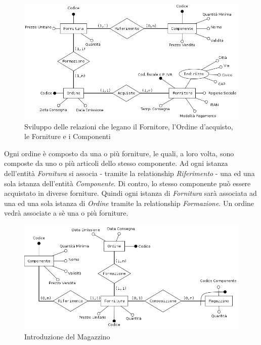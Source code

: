 			\begin{figure}[H]
				\centering
				\includegraphics[width=13cm]{images/finitures/fornitore_ordine_fornitura_componente}
				\caption{Sviluppo delle relazioni che legano il Fornitore, l'Ordine d'acquisto, le Forniture e i Componenti}
				\label{fig:fornitore_ordine_fornitura_componente}
			\end{figure}
			
			Ogni ordine è composto da una o più forniture, le quali, a loro volta, sono composte da uno o più articoli dello stesso componente. Ad ogni istanza dell'entità \emph{Fornitura} si associa - tramite la relationship \emph{Riferimento} - una ed una sola istanza dell'entità \emph{Componente}. Di contro, lo stesso componente può essere acquistato in diverse forniture.
			Quindi ogni istanza di \emph{Fornitura} sarà associata ad una ed una sola istanza di \emph{Ordine} tramite la relationship \emph{Formazione}. Un ordine vedrà associate a sè una o più forniture.
			
			\begin{figure}
				\centering
				\includegraphics[width=13cm]{images/finitures/componente_fornitura_ordine_magazzino.png}
				\caption{Introduzione del Magazzino}
				\label{fig:componente_fornitura_ordine_magazzino}
			\end{figure}
			
